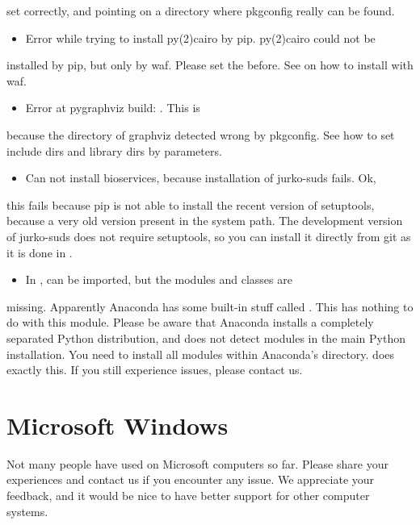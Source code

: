 \documentclass[letterpaper,10pt,english]{sphinxmanual}
\begin{document}
set correctly, and pointing on a directory where pkgconfig really can be
found.
\begin{itemize}
\item {} 
Error while trying to install py(2)cairo by pip. py(2)cairo could not be

\end{itemize}

installed by pip, but only by waf. Please set the  before.
See  on how to install with waf.
\begin{itemize}
\item {} 
Error at pygraphviz build: . This is

\end{itemize}

because the directory of graphviz detected wrong by pkgconfig. See
 how to set include dirs and library dirs by
 parameters.
\begin{itemize}
\item {} 
Can not install bioservices, because installation of jurko-suds fails. Ok,

\end{itemize}

this fails because pip is not able to install the recent version of
setuptools, because a very old version present in the system path. The
development version of jurko-suds does not require setuptools, so you can
install it directly from git as it is done in .
\begin{itemize}
\item {} 
In ,  can be imported, but the modules and classes are

\end{itemize}

missing. Apparently Anaconda has some built-in stuff called . This
has nothing to do with this module. Please be aware that Anaconda installs a
completely separated Python distribution, and does not detect modules in the
main Python installation. You need to install all modules within Anaconda’s
directory.  does exactly this. If you still
experience issues, please contact us.


\section{Microsoft Windows}
\label{\detokenize{installation:microsoft-windows}}
Not many people have used  on Microsoft computers so far. Please share
your experiences and contact us if you encounter any issue. We appreciate
your feedback, and it would be nice to have better support for other computer
systems.
\end{document}
